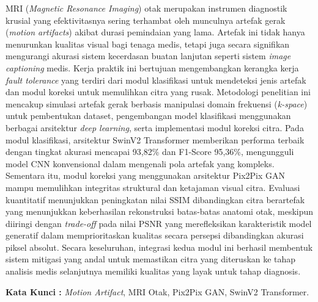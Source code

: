 MRI (\textit{Magnetic Resonance Imaging}) otak merupakan instrumen diagnostik krusial yang efektivitasnya sering terhambat oleh munculnya artefak gerak (\textit{motion artifacts}) akibat durasi pemindaian yang lama. Artefak ini tidak hanya menurunkan kualitas visual bagi tenaga medis, tetapi juga secara signifikan mengurangi akurasi sistem kecerdasan buatan lanjutan seperti sistem \textit{image captioning} medis. Kerja praktik ini bertujuan mengembangkan kerangka kerja \textit{fault tolerance} yang terdiri dari modul klasifikasi untuk mendeteksi jenis artefak dan modul koreksi untuk memulihkan citra yang rusak. Metodologi penelitian ini mencakup simulasi artefak gerak berbasis manipulasi domain frekuensi (\textit{k-space}) untuk pembentukan dataset, pengembangan model klasifikasi menggunakan berbagai arsitektur \textit{deep learning}, serta implementasi modul koreksi citra. Pada modul klasifikasi, arsitektur SwinV2 Transformer memberikan performa terbaik dengan tingkat akurasi mencapai 93,82\% dan F1-Score 95,36\%, mengungguli model CNN konvensional dalam mengenali pola artefak yang kompleks. Sementara itu, modul koreksi yang menggunakan arsitektur Pix2Pix GAN mampu memulihkan integritas struktural dan ketajaman visual citra. Evaluasi kuantitatif menunjukkan peningkatan nilai SSIM dibandingkan citra berartefak yang menunjukkan keberhasilan rekonstruksi batas-batas anatomi otak, meskipun diiringi dengan \textit{trade-off} pada nilai PSNR yang merefleksikan karakteristik model generatif dalam memprioritaskan kualitas secara persepsi dibandingkan akurasi piksel absolut. Secara keseluruhan, integrasi kedua modul ini berhasil membentuk sistem mitigasi yang andal untuk memastikan citra yang diteruskan ke tahap analisis medis selanjutnya memiliki kualitas yang layak untuk tahap diagnosis.

\vspace{2ex} %

\noindent\textbf{Kata Kunci :} \textit{Motion Artifact}, MRI Otak, Pix2Pix GAN, SwinV2 Transformer.

